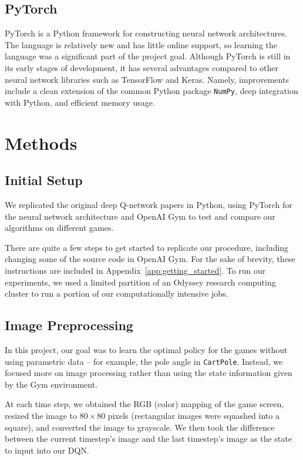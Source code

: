 \documentclass[11pt]{article}
\newcommand{\cp}{\texttt{CartPole}}
\begin{document}
\subsection{PyTorch}

PyTorch \cite{paszke2017pytorch} is a Python framework for constructing neural network architectures. The language is relatively new and has little online support, so learning the language was a significant part of the project goal. Although PyTorch is still in its early stages of development, it has several advantages compared to other neural network libraries such as TensorFlow and Keras. Namely, improvements include a clean extension of the common Python package \texttt{NumPy}, deep integration with Python, and efficient memory usage. 

\section{Methods}

\subsection{Initial Setup}

We replicated the original deep Q-network papers \cite{mnih2013playing, mnih2015human} in Python, using PyTorch \cite{paszke2017pytorch} for the neural network architecture and OpenAI Gym \cite{brockman2016openai} to test and compare our algorithms on different games. 

There are quite a few steps to get started to replicate our procedure, including changing some of the source code in OpenAI Gym. For the sake of brevity, these instructions are included in Appendix~\ref{app:getting_started}. To run our experiments, we used a limited partition of an Odyssey research computing cluster to run a portion of our computationally intensive jobs.

\subsection{Image Preprocessing}

In this project, our goal was to learn the optimal policy for the games without using parametric data -- for example, the pole angle in \cp. Instead, we focused more on image processing rather than using the state information given by the Gym environment.

At each time step, we obtained the RGB (color) mapping of the game screen, resized the image to $80 \times 80$ pixels (rectangular images were squashed into a square), and converted the image to grayscale. We then took the difference between the current timestep's image and the last timestep's image as the state to input into our DQN. 
\end{document}
